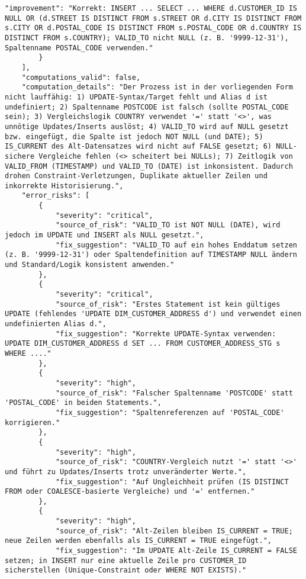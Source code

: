 \begin{lstlisting}[caption={Ausgabe: GPT-5 Anwendungsfall 9 Konsistenzdurchlauf},label={gpt_case9_prompt2}]
            "improvement": "Korrekt: INSERT ... SELECT ... WHERE d.CUSTOMER_ID IS NULL OR (d.STREET IS DISTINCT FROM s.STREET OR d.CITY IS DISTINCT FROM s.CITY OR d.POSTAL_CODE IS DISTINCT FROM s.POSTAL_CODE OR d.COUNTRY IS DISTINCT FROM s.COUNTRY); VALID_TO nicht NULL (z. B. '9999-12-31'), Spaltenname POSTAL_CODE verwenden."
        }
    ],
    "computations_valid": false,
    "computation_details": "Der Prozess ist in der vorliegenden Form nicht lauffähig: 1) UPDATE-Syntax/Target fehlt und Alias d ist undefiniert; 2) Spaltenname POSTCODE ist falsch (sollte POSTAL_CODE sein); 3) Vergleichslogik COUNTRY verwendet '=' statt '<>', was unnötige Updates/Inserts auslöst; 4) VALID_TO wird auf NULL gesetzt bzw. eingefügt, die Spalte ist jedoch NOT NULL (und DATE); 5) IS_CURRENT des Alt-Datensatzes wird nicht auf FALSE gesetzt; 6) NULL-sichere Vergleiche fehlen (<> scheitert bei NULLs); 7) Zeitlogik von VALID_FROM (TIMESTAMP) und VALID_TO (DATE) ist inkonsistent. Dadurch drohen Constraint-Verletzungen, Duplikate aktueller Zeilen und inkorrekte Historisierung.",
    "error_risks": [
        {
            "severity": "critical",
            "source_of_risk": "VALID_TO ist NOT NULL (DATE), wird jedoch im UPDATE und INSERT als NULL gesetzt.",
            "fix_suggestion": "VALID_TO auf ein hohes Enddatum setzen (z. B. '9999-12-31') oder Spaltendefinition auf TIMESTAMP NULL ändern und Standard/Logik konsistent anwenden."
        },
        {
            "severity": "critical",
            "source_of_risk": "Erstes Statement ist kein gültiges UPDATE (fehlendes 'UPDATE DIM_CUSTOMER_ADDRESS d') und verwendet einen undefinierten Alias d.",
            "fix_suggestion": "Korrekte UPDATE-Syntax verwenden: UPDATE DIM_CUSTOMER_ADDRESS d SET ... FROM CUSTOMER_ADDRESS_STG s WHERE ...."
        },
        {
            "severity": "high",
            "source_of_risk": "Falscher Spaltenname 'POSTCODE' statt 'POSTAL_CODE' in beiden Statements.",
            "fix_suggestion": "Spaltenreferenzen auf 'POSTAL_CODE' korrigieren."
        },
        {
            "severity": "high",
            "source_of_risk": "COUNTRY-Vergleich nutzt '=' statt '<>' und führt zu Updates/Inserts trotz unveränderter Werte.",
            "fix_suggestion": "Auf Ungleichheit prüfen (IS DISTINCT FROM oder COALESCE-basierte Vergleiche) und '=' entfernen."
        },
        {
            "severity": "high",
            "source_of_risk": "Alt-Zeilen bleiben IS_CURRENT = TRUE; neue Zeilen werden ebenfalls als IS_CURRENT = TRUE eingefügt.",
            "fix_suggestion": "Im UPDATE Alt-Zeile IS_CURRENT = FALSE setzen; in INSERT nur eine aktuelle Zeile pro CUSTOMER_ID sicherstellen (Unique-Constraint oder WHERE NOT EXISTS)."

\end{lstlisting}
